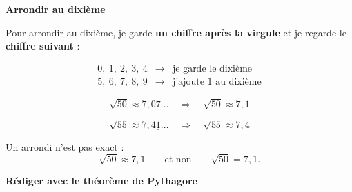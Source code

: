 \documentclass[12pt,a4paper]{article}
\newcommand{\minititre}[1]{%
{\sffamily\large\bfseries\color{SavoirC}#1}\par
\vspace{0.12em}
}
\begin{document}

\newpage
\small


\minititre{Arrondir au dixième}

\begin{tcolorbox}[
  enhanced,
  colback=SavoirBg,
  colframe=SavoirC!45,
  boxrule=0.5pt,
  arc=1.5mm,
  left=4mm,
  right=4mm,
  top=1.5mm,
  bottom=1.5mm
]

Pour arrondir au dixième, je garde \textbf{un chiffre après la virgule}
et je regarde le \textbf{chiffre suivant} :

\[
\boxed{
\begin{array}{ccl}
0,\ 1,\ 2,\ 3,\ 4 &\longrightarrow& \text{je garde le dixième}\\[0.2em]
5,\ 6,\ 7,\ 8,\ 9 &\longrightarrow& \text{j'ajoute 1 au dixième}
\end{array}
}
\]

\[
\sqrt{50}\approx7{,}\boxed{0}\underline{7}\ldots
\quad\Longrightarrow\quad
\boxed{\sqrt{50}\approx7{,}1}
\]

\[
\sqrt{55}\approx7{,}\boxed{4}\underline{1}\ldots
\quad\Longrightarrow\quad
\boxed{\sqrt{55}\approx7{,}4}
\]

\begin{center}
Un arrondi n'est pas exact :
\[
\boxed{\sqrt{50}\approx7{,}1}
\qquad\text{et non}\qquad
\sqrt{50}=7{,}1.
\]
\end{center}

\end{tcolorbox}

\vspace{0.4em}


\minititre{Rédiger avec le théorème de Pythagore}
\end{document}
